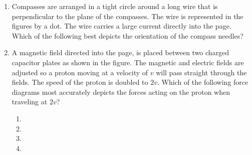 \documentclass{../../oss-apphys}
\begin{document}
\begin{multicols}{2}
\begin{enumerate}[leftmargin=18pt,resume]
  \item Compasses are arranged in a tight circle around a long wire that is
    perpendicular to the plane of the compasses. The wire is represented in
    the figures by a dot. The wire carries a large current directly into the
    page. Which of the following best depicts the orientation of the compass
    needles?
    

  \item A magnetic field directed into the page, is placed between two charged
    capacitor plates as shown in the figure. The magnetic and electric fields
    are adjusted so a proton moving at a velocity of $v$ will pass straight
    through the fields. The speed of the proton is doubled to $2v$. Which of
    the following force diagrams most accurately depicts the forces acting on
    the proton when traveling at $2v$?
    \vspace{-.2in}
    \begin{center}
    \end{center}
    
    \begin{enumerate}[noitemsep,topsep=0pt,leftmargin=18pt,label=(\Alph*)]
    \item\vspace{-.1in}\hspace{.4in}
    \item\hspace{.4in}
    \item{}
    \item{}
    \end{enumerate}
  \end{enumerate}


\end{multicols}
\end{document}
